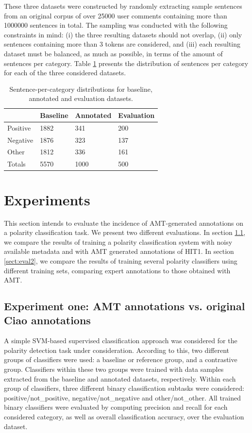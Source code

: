 \documentclass[11pt]{elsarticle}
\begin{document}
These three datasets were constructed by randomly extracting sample sentences from an original corpus
of over 25000 user comments containing more than 1000000 sentences in total. The sampling was conducted
with the following constraints in mind: (i) the three resulting datasets should not overlap, (ii) only sentences
containing more than 3 tokens are considered, and (iii) each resulting dataset must be balanced, as much
as possible, in terms of the amount of sentences per category. Table \ref{tc_corpus} presents the
distribution of sentences per category for each of the three considered datasets.

\begin{table}
\begin{center}
\begin{tabular}{|l|l|l|l|}
\hline
&Baseline &Annotated &Evaluation \\
\hline
Positive &1882 &341 &200 \\
\hline
Negative &1876 &323 &137 \\
\hline
Other &1812 &336 &161 \\
\hline
Totals &5570 &1000 &500 \\
\hline
\end{tabular}
\caption{Sentence-per-category distributions for baseline, annotated and evaluation datasets.}
\label{tc_corpus}
\end{center}
\end{table}

\section{Experiments}
\label{sect:classifier}


This section intends to evaluate the incidence of AMT-generated annotations on a polarity classification task. We present two different evaluations. In section \ref{sect:eval1}, we compare the results of training a polarity classification system with noisy available metadata and with AMT generated annotations of HIT1. In section \ref{sect:eval2}, we compare the results of training several polarity classifiers using different training sets, comparing expert annotations to those obtained with AMT.


\subsection{Experiment one: AMT annotations vs. original Ciao annotations}
\label{sect:eval1}
A simple SVM-based supervised classification approach was considered for the
polarity detection task under consideration. According to this, two different groups of classifiers were
used: a baseline or reference group, and a contrastive group. Classifiers within these two groups were
trained with data samples extracted from the baseline and annotated datasets, respectively. Within each group
of classifiers, three different binary classification subtasks were considered: positive/not\_positive,
negative/not\_negative and other/not\_other. All trained binary classifiers were evaluated by computing
precision and recall for each considered category, as well as overall classification accuracy, over the
evaluation dataset.
\end{document}
